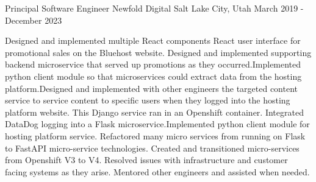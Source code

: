 \cventry
{Principal Software Engineer} %
{Newfold Digital} %
{Salt Lake City, Utah} %
{March 2019 - December 2023} %
{
	\begin{cvitems} %
		\item{
			Designed and implemented multiple React components React user interface for promotional sales on the Bluehost website. Designed and implemented supporting backend microservice that served up promotions as they occurred.Implemented python client module so that microservices could extract data from the hosting platform.Designed and implemented with other engineers the targeted content service to service content to specific users when they logged into the hosting platform website. This Django service ran in an Openshift container. Integrated DataDog logging into a Flask microservice.Implemented python client module for hosting platform service. Refactored many micro services from running on Flask to FastAPI micro-service technologies. Created and transitioned micro-services from Openshift V3 to V4. Resolved issues with infrastructure and customer facing systems as they arise. Mentored other engineers and assisted when needed.}                                                                                                                                                                                                                                                                                                                                                                                                                                                                                                                                                                                                                                                                                                                                                                                                                                                                                                                                                                                                                                                                                                                                                                                                                                                                                                                                                                                                     
	\end{cvitems}
}